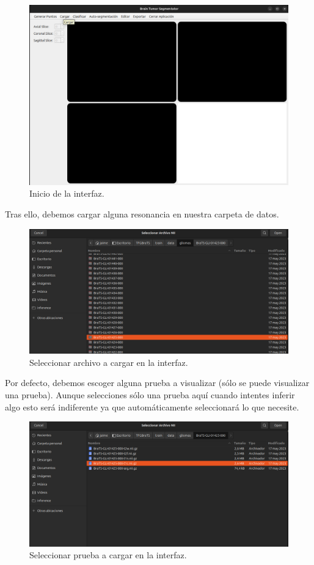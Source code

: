 \begin{figure}[H]
	\centering
	\includegraphics[width=0.7\linewidth]{imagenes/interfaz_inicio.png}
	\caption{Inicio de la interfaz.}
\end{figure}

Tras ello, debemos cargar alguna resonancia en nuestra carpeta de datos.

\begin{figure}[H]
	\centering
	\includegraphics[width=0.7\linewidth]{imagenes/interfaz_seleccarchivo.png}
	\caption{Seleccionar archivo a cargar en la interfaz.}
\end{figure}

Por defecto, debemos escoger alguna prueba a visualizar (sólo se puede visualizar una prueba). Aunque selecciones sólo una prueba aquí cuando intentes inferir algo esto será indiferente ya que automáticamente seleccionará lo que necesite. 

\begin{figure}[H]
	\centering
	\includegraphics[width=0.7\linewidth]{imagenes/interfaz_seleccprueba.png}
	\caption{Seleccionar prueba a cargar en la interfaz.}
\end{figure}

